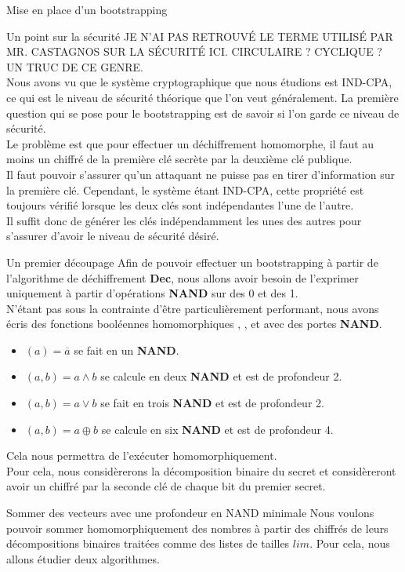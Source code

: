 \begin{section}{Mise en place d'un bootstrapping}
\begin{subsection}{Un point sur la sécurité}
JE N'AI PAS RETROUVÉ LE TERME UTILISÉ PAR MR. CASTAGNOS SUR LA SÉCURITÉ ICI.
CIRCULAIRE ? CYCLIQUE ? UN TRUC DE CE GENRE.\\
Nous avons vu que le système cryptographique que nous étudions est IND-CPA, ce qui est le niveau de sécurité théorique que l'on veut généralement. La première question qui se pose pour le bootstrapping est de savoir si l'on garde ce niveau de sécurité.\\
Le problème est que pour effectuer un déchiffrement homomorphe, il faut au moins un chiffré de la première clé secrète par la deuxième clé publique. \\
Il faut pouvoir s'assurer qu'un attaquant ne puisse pas en tirer d'information sur la première clé. Cependant, le système étant IND-CPA, cette propriété est toujours vérifié lorsque les deux clés sont indépendantes l'une de l'autre. \\
Il suffit donc de générer les clés indépendamment les unes des autres pour s'assurer d'avoir le niveau de sécurité désiré.
\end{subsection}
\begin{subsection}{Un premier découpage}
Afin de pouvoir effectuer un bootstrapping à partir de l'algorithme de déchiffrement \textbf{Dec}, nous allons avoir besoin de l'exprimer uniquement à partir d'opérations \textbf{NAND} sur des 0 et des 1. \\
N'étant pas sous la contrainte d'être particulièrement performant, nous avons écris des fonctions booléennes homomorphiques , ,  et  avec des portes \textbf{NAND}. \\
\begin{itemize}
\item {}$(a) = \overline{a}$ se fait en un \textbf{NAND}. \\
\item {}$(a, b) = a \land b$ se calcule en deux \textbf{NAND} et est de profondeur 2. \\
\item {}$(a, b) = a \lor b$ se fait en trois \textbf{NAND} et est de profondeur 2. \\
\item {}$(a, b) = a \oplus b$ se calcule en six \textbf{NAND} et est de profondeur 4. \\
\end{itemize}
Cela nous permettra de l'exécuter homomorphiquement. \\
Pour cela, nous considèrerons la décomposition binaire du secret et considèreront avoir un chiffré par la seconde clé de chaque bit du premier secret.
\end{subsection}
\begin{subsection}{Sommer des vecteurs avec une profondeur en NAND minimale}
Nous voulons pouvoir sommer homomorphiquement des nombres à partir des chiffrés de leurs décompositions binaires traitées comme des listes de tailles $lim$. Pour cela, nous allons étudier deux algorithmes. \\


\end{subsection}
\end{section}
